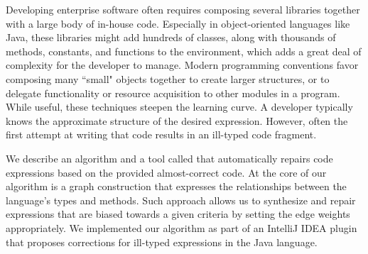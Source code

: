 Developing enterprise software often requires composing several
libraries together with a large body of in-house code. Especially in
object-oriented languages like Java, these libraries might add
hundreds of classes, along with thousands of methods, constants, and
functions to the environment, which adds a great deal of complexity
for the developer to manage. Modern programming conventions favor
composing many ``small" objects together to create larger structures,
or to delegate functionality or resource acquisition to other modules
in a program. While useful, these techniques steepen the learning
curve. A developer typically knows the approximate structure of the
desired expression. However, often the first attempt at writing that
code results in an ill-typed code fragment.

We describe an algorithm and a tool called \ourTool that automatically
repairs code expressions based on the provided almost-correct code. At
the core of our algorithm is a graph construction that expresses the
relationships between the language's types and methods. Such approach
allows us to synthesize and repair expressions that are biased towards
a given criteria by setting the edge weights appropriately. We
implemented our algorithm as part of an IntelliJ IDEA plugin that
proposes corrections for ill-typed expressions in the Java language.
